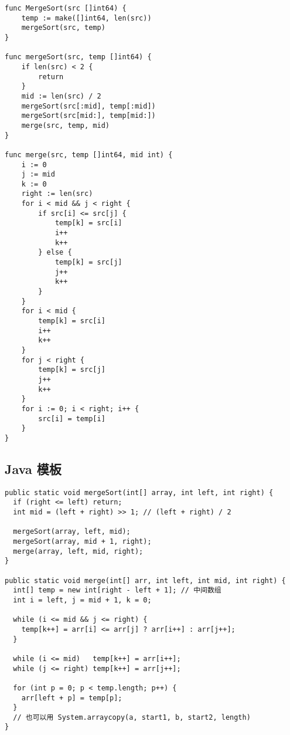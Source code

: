 \begin{verbatim}
func MergeSort(src []int64) {
	temp := make([]int64, len(src))
	mergeSort(src, temp)
}

func mergeSort(src, temp []int64) {
	if len(src) < 2 {
		return
	}
	mid := len(src) / 2
	mergeSort(src[:mid], temp[:mid])
	mergeSort(src[mid:], temp[mid:])
	merge(src, temp, mid)
}

func merge(src, temp []int64, mid int) {
	i := 0
	j := mid
	k := 0
	right := len(src)
	for i < mid && j < right {
		if src[i] <= src[j] {
			temp[k] = src[i]
			i++
			k++
		} else {
			temp[k] = src[j]
			j++
			k++
		}
	}
	for i < mid {
		temp[k] = src[i]
		i++
		k++
	}
	for j < right {
		temp[k] = src[j]
		j++
		k++
	}
	for i := 0; i < right; i++ {
		src[i] = temp[i]
	}
}
\end{verbatim}

\subsection{Java 模板}

\begin{verbatim}
public static void mergeSort(int[] array, int left, int right) {
  if (right <= left) return;
  int mid = (left + right) >> 1; // (left + right) / 2

  mergeSort(array, left, mid);
  mergeSort(array, mid + 1, right);
  merge(array, left, mid, right);
}

public static void merge(int[] arr, int left, int mid, int right) {
  int[] temp = new int[right - left + 1]; // 中间数组
  int i = left, j = mid + 1, k = 0;

  while (i <= mid && j <= right) {
    temp[k++] = arr[i] <= arr[j] ? arr[i++] : arr[j++];
  }

  while (i <= mid)   temp[k++] = arr[i++];
  while (j <= right) temp[k++] = arr[j++];

  for (int p = 0; p < temp.length; p++) {
    arr[left + p] = temp[p];
  }
  // 也可以用 System.arraycopy(a, start1, b, start2, length)
}
\end{verbatim}
